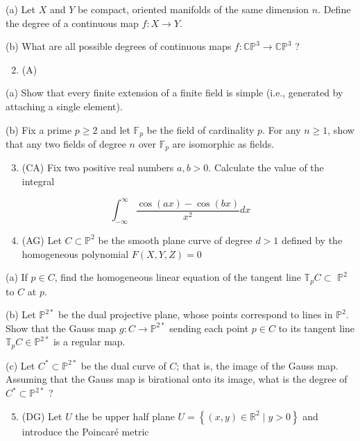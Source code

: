 \documentclass[10pt]{article}
\begin{document}
(a) Let $X$ and $Y$ be compact, oriented manifolds of the same dimension $n$. Define the degree of a continuous map $f: X \rightarrow Y$.

(b) What are all possible degrees of continuous maps $f: \mathbb{C P}^{3} \rightarrow \mathbb{C P}^{3}$ ?

\begin{enumerate}
  \setcounter{enumi}{1}
  \item (A)
\end{enumerate}

(a) Show that every finite extension of a finite field is simple (i.e., generated by attaching a single element).

(b) Fix a prime $p \geq 2$ and let $\mathbb{F}_{p}$ be the field of cardinality $p$. For any $n \geq 1$, show that any two fields of degree $n$ over $\mathbb{F}_{p}$ are isomorphic as fields.

\begin{enumerate}
  \setcounter{enumi}{2}
  \item (CA) Fix two positive real numbers $a, b>0$. Calculate the value of the integral
\end{enumerate}

$$
\int_{-\infty}^{\infty} \frac{\cos (a x)-\cos (b x)}{x^{2}} d x
$$

\begin{enumerate}
  \setcounter{enumi}{3}
  \item (AG) Let $C \subset \mathbb{P}^{2}$ be the smooth plane curve of degree $d>1$ defined by the homogeneous polynomial $F(X, Y, Z)=0$
\end{enumerate}

(a) If $p \in C$, find the homogeneous linear equation of the tangent line $\mathbb{T}_{p} C \subset$ $\mathbb{P}^{2}$ to $C$ at $p$.

(b) Let $\mathbb{P}^{2 *}$ be the dual projective plane, whose points correspond to lines in $\mathbb{P}^{2}$. Show that the Gauss map $g: C \rightarrow \mathbb{P}^{2 *}$ sending each point $p \in C$ to its tangent line $\mathbb{T}_{p} C \in \mathbb{P}^{2 *}$ is a regular map.

(c) Let $C^{*} \subset \mathbb{P}^{2 *}$ be the dual curve of $C$; that is, the image of the Gauss map. Assuming that the Gauss map is birational onto its image, what is the degree of $C^{*} \subset \mathbb{P}^{2 *}$ ?

\begin{enumerate}
  \setcounter{enumi}{4}
  \item (DG) Let $U$ the be upper half plane $U=\left\{(x, y) \in \mathbb{R}^{2} \mid y>0\right\}$ and introduce the Poincaré metric
\end{enumerate}
\end{document}
